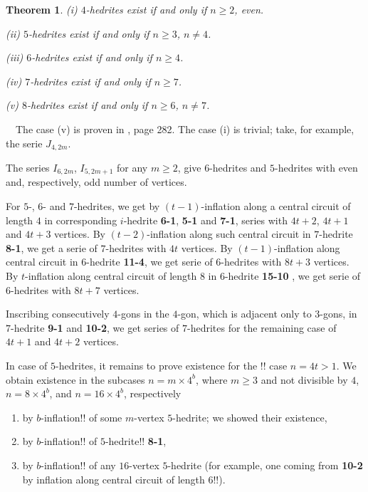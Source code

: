 \documentclass[12pt]{article}
\newtheorem{theorem}{Theorem}
\newcommand{\proof}{\noindent{\bf Proof.}\ \ }
\begin{document}
\begin{theorem}

(i) $4$-hedrites exist if and only if $n\geq 2$, even.

(ii) $5$-hedrites exist if and only if $n\geq 3$, $n\not= 4$.

(iii) $6$-hedrites exist if and only if $n\geq 4$.

(iv) $7$-hedrites exist if and only if $n\geq 7$.

(v) $8$-hedrites exist if and only if $n\geq 6$, $n\not= 7$.

\end{theorem}
\proof The case (v) is proven in \cite{Gr}, page 282.
The case (i) is trivial; take, for example, the serie $J_{4,2m}$.

The series $I_{6,2m}$, $I_{5,2m+1}$ for any $m \ge 2$, give $6$-hedrites
and $5$-hedrites with even and, respectively, odd number of vertices.



For $5$-, $6$- and $7$-hedrites, we 
get by $(t-1)$-inflation
along a central circuit of length $4$ in corresponding
$i$-hedrite {\bf 6-1}, {\bf 5-1} and {\bf 7-1},
series with $4t+2$, $4t+1$ and $4t+3$ vertices. 
By $(t-2)$-inflation
along such central circuit in $7$-hedrite {\bf 8-1}, we get a serie of
$7$-hedrites with $4t$ vertices.
By $(t-1)$-inflation along central circuit in $6$-hedrite {\bf 11-4}, we
get serie of $6$-hedrites with $8t+3$ vertices.
By $t$-inflation along central circuit of length $8$ in 
$6$-hedrite {\bf 15-10 }, 
we get serie of $6$-hedrites with $8t+7$ vertices.




Inscribing consecutively $4$-gons in the $4$-gon, which is adjacent only to
$3$-gons, in $7$-hedrite {\bf 9-1} and {\bf 10-2}, we get series of 
$7$-hedrites for the remaining case of $4t+1$ and $4t+2$ vertices.

In case of $5$-hedrites, it remains to prove existence for the !! case $n=4t>1$.
We obtain existence in the subcases $n=m\times 4^b$, where $m\geq 3$ and not divisible by $4$, $n=8\times 4^b$, and $n=16\times 4^b$, respectively
\begin{enumerate}
\item by $b$-inflation!! of some $m$-vertex $5$-hedrite; we showed their existence,
\item by $b$-inflation!! of $5$-hedrite!! {\bf 8-1},
\item by $b$-inflation!! of any $16$-vertex $5$-hedrite (for example, one coming from {\bf 10-2} by inflation along central circuit of length $6$!!).
\end{enumerate}
\end{document}
